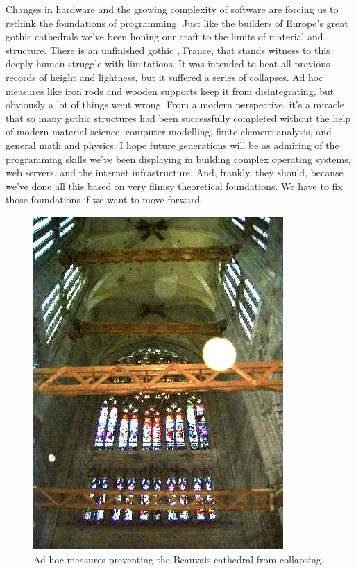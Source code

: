 Changes in hardware and the growing complexity of software are forcing
us to rethink the foundations of programming. Just like the builders of
Europe's great gothic cathedrals we've been honing our craft to the
limits of material and structure. There is an unfinished gothic
, France, that stands witness to this deeply human struggle
with limitations. It was intended to beat all previous records of height
and lightness, but it suffered a series of collapses. Ad hoc measures
like iron rods and wooden supports keep it from disintegrating, but
obviously a lot of things went wrong. From a modern perspective, it's a
miracle that so many gothic structures had been successfully completed
without the help of modern material science, computer modelling, finite
element analysis, and general math and physics. I hope future
generations will be as admiring of the programming skills we've been
displaying in building complex operating systems, web servers, and the
internet infrastructure. And, frankly, they should, because we've done
all this based on very flimsy theoretical foundations. We have to fix
those foundations if we want to move forward.

\begin{figure}
\centering
\includegraphics[totalheight=8cm]{images/beauvais_interior_supports.jpg}
\caption{Ad hoc measures preventing the Beauvais cathedral from collapsing.}
\end{figure}